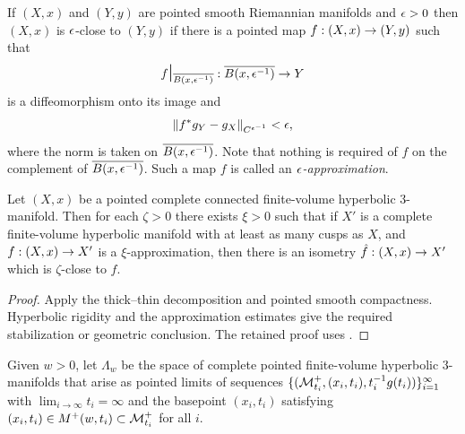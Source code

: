 \begin{definition}
  \label{def:kl-hyperbolic-rigidity-stabilization-thick-part-pointed-smooth-closeness}

If $(X,x)$ and $(Y,y)$ are pointed smooth Riemannian manifolds
and $\epsilon>0$ then $(X,x)$ is $\epsilon$-close to $(Y,y)$
if there is a pointed map $f:(X,x)\rightarrow (Y,y)$ such that
\begin{equation}
f\mbox{\Large \(|\)\normalsize}_{\overline{B(x,\epsilon^{-1})}}:\overline{B(x,\epsilon^{-1})}\rightarrow Y
\end{equation}
 is a diffeomorphism onto its image
and
\begin{equation}
\label{fapprox}
\|f^*g_Y-g_X\|_{C^{\epsilon^{-1}}}<\epsilon,
\end{equation}
where the norm is taken on $\overline{B(x,\epsilon^{-1})}$.
Note that nothing is required of $f$ on the complement of $\overline{B(x,\epsilon^{-1})}$.
Such a map $f$ is called an {\em $\epsilon$-approximation}.
\end{definition}

\begin{lemma}
  \label{lem:kl-hyperbolic-rigidity-stabilization-thick-part-existence-thick-thin-geometry}

\label{prasad}
Let $(X,x)$ be a pointed complete connected finite-volume hyperbolic
$3$-manifold.  Then for each $\zeta>0$ there exists $\xi>0$
such that if $X'$ is a complete finite-volume hyperbolic
manifold with at least as many cusps as $X$,
and $f:(X,x)\rightarrow X'$ is a $\xi$-approximation, then there is an
isometry $\hat f: (X,x)\rightarrow X'$ which
is $\zeta$-close to $f$.
\end{lemma}

\begin{proof}
\sketch Apply the thick--thin decomposition and pointed smooth compactness. Hyperbolic rigidity and the approximation estimates give the required stabilization or geometric conclusion.
The retained proof uses \cite{Mostow,Prasad}.
\end{proof}

\begin{definition}
  \label{def:kl-hyperbolic-rigidity-stabilization-thick-part-hyperbolic-pointed-limit-space}

Given $w >0$, let $\Lambda_w$ be the space
of complete pointed finite-volume hyperbolic
$3$-manifolds that arise as pointed limits of
sequences $\{({\mathcal M}^+_{t_i}, (x_i, t_i), t_i^{-1} g(t_i))\}_{i=1}^\infty$
with $\lim_{i \rightarrow \infty} t_i = \infty$ and the basepoint
$(x_i,t_i)$ satisfying
$(x_i,t_i) \in M^+(w, t_i) \subset {\mathcal M}^+_{t_i}$
for all $i$.
\end{definition}

